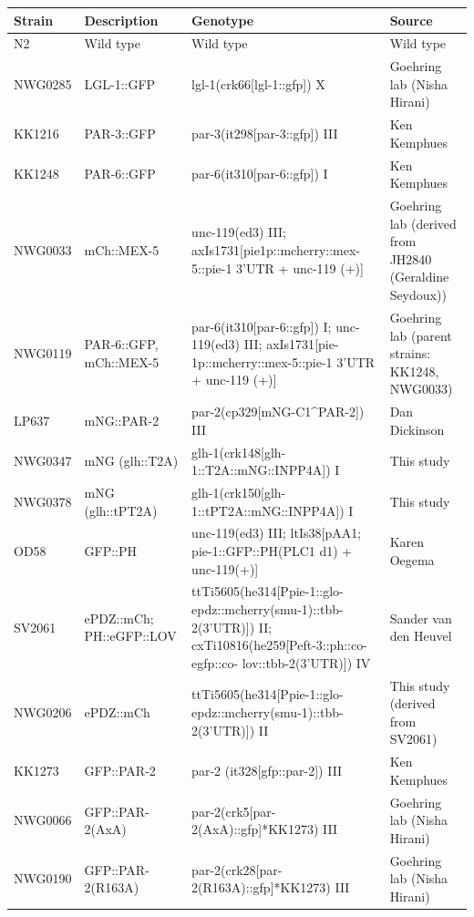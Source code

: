 \documentclass[12pt]{"report"}
\begin{document}
\begin{longtabu} to 
    
\hline
\textbf{Strain} & \textbf{Description} & \textbf{Genotype} & \textbf{Source} \\ \hline
\endhead
%
N2 & Wild type & Wild type & Wild type \\ \hline
NWG0285 & LGL-1::GFP & lgl-1(crk66{[}lgl-1::gfp{]}) X & Goehring lab (Nisha Hirani) \\ \hline
KK1216 & PAR-3::GFP & par-3(it298{[}par-3::gfp{]}) III & Ken Kemphues \\ \hline
KK1248 & PAR-6::GFP & par-6(it310{[}par-6::gfp{]}) I & Ken Kemphues \\ \hline
NWG0033 & mCh::MEX-5 & unc-119(ed3) III; axIs1731{[}pie1p::mcherry::mex-5::pie-1 3'UTR + unc-119   (+){]} & Goehring lab (derived from JH2840 (Geraldine Seydoux)) \\ \hline
NWG0119 & PAR-6::GFP, mCh::MEX-5 & par-6(it310{[}par-6::gfp{]}) I; unc-119(ed3) III;   axIs1731{[}pie-1p::mcherry::mex-5::pie-1 3'UTR + unc-119 (+){]} & Goehring lab (parent strains: KK1248, NWG0033) \\ \hline
LP637 & mNG::PAR-2 & par-2(cp329{[}mNG-C1\textasciicircum{}PAR-2{]}) III & Dan Dickinson \\ \hline
NWG0347 & mNG (glh::T2A) & glh-1(crk148{[}glh-1::T2A::mNG::INPP4A{]}) I & This study \\ \hline
NWG0378 & mNG (glh::tPT2A) & glh-1(crk150{[}glh-1::tPT2A::mNG::INPP4A{]}) I & This study \\ \hline
OD58 & GFP::PH & unc-119(ed3) III; ltIs38{[}pAA1; pie-1::GFP::PH(PLC1 d1) + unc-119(+){]} & Karen Oegema \\ \hline
SV2061 & ePDZ::mCh;   PH::eGFP::LOV & ttTi5605(he314{[}Ppie-1::glo-epdz::mcherry(smu-1)::tbb-2(3'UTR){]})   II; cxTi10816(he259{[}Peft-3::ph::co-egfp::co- lov::tbb-2(3'UTR){]}) IV & Sander van den Heuvel \\ \hline
NWG0206 & ePDZ::mCh & ttTi5605(he314{[}Ppie-1::glo-epdz::mcherry(smu-1)::tbb-2(3'UTR){]})   II & This study (derived from SV2061) \\ \hline
KK1273 & GFP::PAR-2 & par-2 (it328{[}gfp::par-2{]}) III & Ken Kemphues \\ \hline
NWG0066 & GFP::PAR-2(AxA) & par-2(crk5{[}par-2(AxA)::gfp{]}*KK1273) III & Goehring lab (Nisha Hirani) \\ \hline
NWG0190 & GFP::PAR-2(R163A) & par-2(crk28{[}par-2(R163A)::gfp{]}*KK1273) III & Goehring lab (Nisha Hirani) \\ \hline

\end{longtabu}
\end{document}
